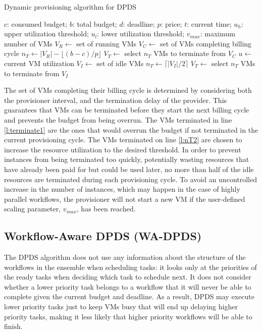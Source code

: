 \documentclass{sig-alternate}
\begin{document}
\begin{algorithm}
\caption{Dynamic provisioning algorithm for DPDS}
\label{alg:prov}
\begin{algorithmic}[1]
\Require $c$: consumed budget; $b$: total budget; $d$: deadline; $p$: price;
$t$: current time; $u_h$: upper utilization threshold; $u_l$: lower utilization
threshold; $v_{max}$: maximum number of VMs
	\State $V_R\gets$ set of running VMs
    \State $V_C\gets$ set of VMs completing billing cycle
    	\State $n_T\gets |V_R| - \lfloor(b-c)/p\rfloor$
    	\State $V_T\gets$ select $n_T$ VMs to terminate from $V_C$
    	\State {} \label{l:terminate1}
    \Else 
		\State $u\gets$ current VM utilization
    		\State {}
    		\State $V_I\gets$ set of idle VMs
    		\State $n_T\gets \lceil|V_I|/2\rceil$ \label{l:nT2}
			\State $V_T\gets$ select $n_T$ VMs to terminate from $V_I$
    		\State {} \label{l:terminate2}
    	\EndIf 
    \EndIf
\EndProcedure
\end{algorithmic} 
\end{algorithm}

The set of VMs completing their billing cycle is determined by considering both the
provisioner interval, and the termination delay of the provider. This guarantees 
that VMs can be terminated before they start the next billing cycle and prevents the
budget from being overrun. The VMs terminated in line \ref{l:terminate1} are the ones 
that would overrun the budget if not terminated in the current provisioning cycle. 
The VMs terminated on line \ref{l:nT2} are chosen to increase the resource utilization
to the desired threshold. In order to prevent instances from being
terminated too quickly, potentially wasting resources that have already been paid for
but could be used later, no more than half of the idle resources are terminated during
each provisioning cycle. To avoid an uncontrolled increase in the number of
instances, which may happen in the case of highly parallel workflows, the provisioner 
will not start a new VM if the user-defined scaling parameter, $v_{max}$, has
been reached.


\subsection{Workflow-Aware DPDS (WA-DPDS)}

The DPDS algorithm does not use any information about the structure of the workflows
in the ensemble when scheduling tasks: it looks only at the priorities of the ready 
tasks when deciding which task to schedule next. It does not consider whether a lower 
priority task belongs to a workflow that it will never be able to complete given the 
current budget and deadline. As a result, DPDS may execute lower priority tasks just 
to keep VMs busy that will end up delaying higher priority tasks, making it less likely
that higher priority workflows will be able to finish.
\end{document}
